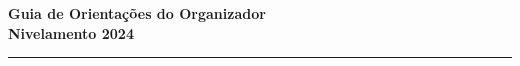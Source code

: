 \thispagestyle{mystyle}

\vspace{0.75cm}
\begin{center}
    {\Large \textbf{Guia de Orientações do Organizador}} \\
    {\Large \textbf{Nivelamento 2024}} \\

\vspace{0.25cm}

    \rule{\linewidth}{0.5mm}
\end{center}
